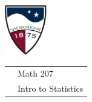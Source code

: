 \documentclass[10pt]{article}
\begin{document}
\pagestyle{empty}

\href{http://www.su.edu}{\includegraphics[height=2.2cm]{sulogo.eps}}
\vspace{-1.69cm}

{\small
\begin{tabular}{cl}
\hspace{5in} & Math 207\\
& Intro to Statistics
\end{tabular}
}
\medskip
\end{document}
